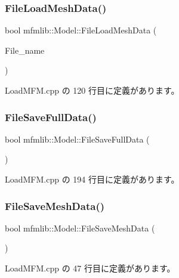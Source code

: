 \subsubsection{\texorpdfstring{File\+Load\+Mesh\+Data()}{FileLoadMeshData()}}
{\footnotesize\ttfamily bool mfmlib\+::\+Model\+::\+File\+Load\+Mesh\+Data (\begin{DoxyParamCaption}\item[{T\+C\+H\+AR $\ast$}]{File\+\_\+name }\end{DoxyParamCaption})}



 Load\+M\+F\+M.\+cpp の 120 行目に定義があります。

\mbox{\label{classmfmlib_1_1_model_a78ed7288a1add6c6140b50f361102374}} 
\subsubsection{\texorpdfstring{File\+Save\+Full\+Data()}{FileSaveFullData()}}
{\footnotesize\ttfamily bool mfmlib\+::\+Model\+::\+File\+Save\+Full\+Data (\begin{DoxyParamCaption}{ }\end{DoxyParamCaption})}



 Load\+M\+F\+M.\+cpp の 194 行目に定義があります。

\mbox{\label{classmfmlib_1_1_model_a27950e34a457b62b0d6474cd8f7017aa}} 
\subsubsection{\texorpdfstring{File\+Save\+Mesh\+Data()}{FileSaveMeshData()}}
{\footnotesize\ttfamily bool mfmlib\+::\+Model\+::\+File\+Save\+Mesh\+Data (\begin{DoxyParamCaption}{ }\end{DoxyParamCaption})}



 Load\+M\+F\+M.\+cpp の 47 行目に定義があります。

